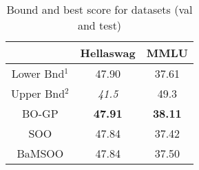 \begin{table}[h!]
    \centering
    \begin{tabular}{|c||c|c|}
    \hline
       & Hellaswag & MMLU\\
    \hline\hline
       Lower Bnd$^1$  & 47.90 & 37.61 \\
       Upper Bnd$^2$  & \textit{41.5} & 49.3 \\
    \hline
       BO-GP  & \textbf{47.91} & \textbf{38.11} \\
       SOO  & 47.84 & 37.42 \\
       BaMSOO  & 47.84 & 37.50 \\
    \hline
    \end{tabular}
    \caption{Bound and best score for datasets (val and test)}
\end{table} 
\vspace*{-15pt}{\footnotesize 1 : LHS results; 2 : Meta Fine tuning }